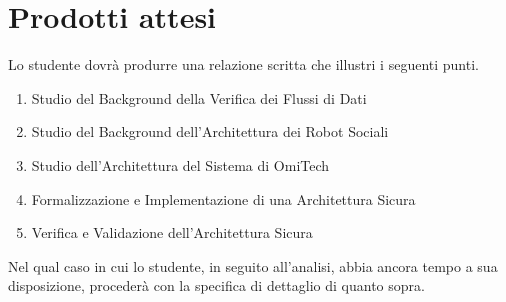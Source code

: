 \section*{Prodotti attesi}
Lo studente dovrà produrre una relazione scritta che illustri i seguenti punti.
\begin{enumerate}
    \item Studio del Background della Verifica dei Flussi di Dati
    \item Studio del Background dell'Architettura dei Robot Sociali
    \item Studio dell'Architettura del Sistema di OmiTech
    \item Formalizzazione e Implementazione di una Architettura Sicura
    \item Verifica e Validazione dell'Architettura Sicura
\end{enumerate}

Nel qual caso in cui lo studente, in seguito all'analisi, abbia ancora tempo a sua disposizione, procederà con la specifica di dettaglio di quanto sopra.
